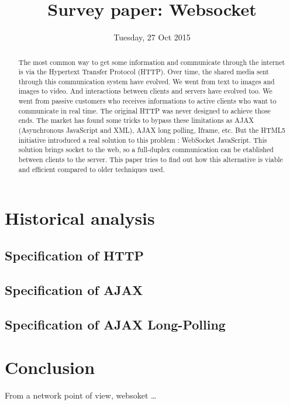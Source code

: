 \documentclass[10pt,journal,compsoc]{IEEEtran}
\begin{document}
\author{}

\title{Survey paper: Websocket}

\date{Tuesday, 27 Oct 2015}

\maketitle
\IEEEpeerreviewmaketitle



\begin{abstract}
The most common way to get some information and communicate through the internet is via the Hypertext Transfer Protocol (HTTP). Over time, the shared media sent through this communication system have evolved. We went from text to images and images to video. And interactions between clients and servers have evolved too. We went from passive customers who receives informations to active clients who want to communicate in real time. The original HTTP was never designed to achieve those ends. The market has found some tricks to bypass these limitations as AJAX (Asynchronous JavaScript and XML), AJAX long polling, Iframe, etc. But the HTML5 initiative introduced a real solution to this problem : WebSocket JavaScript. This solution brings socket to the web, so a full-duplex communication can be etablished between clients to the server. This paper tries to find out how this alternative is viable and efficient compared to older techniques used. \cite{http-rfc}
\end{abstract}

\section{Historical analysis}




\subsection{Specification of HTTP}

\subsection{Specification of AJAX}

\subsection{Specification of AJAX Long-Polling}

\section{Conclusion}

From a network point of view, websoket …


\ifCLASSOPTIONcaptionsoff
  \newpage
\fi




\end{document}
